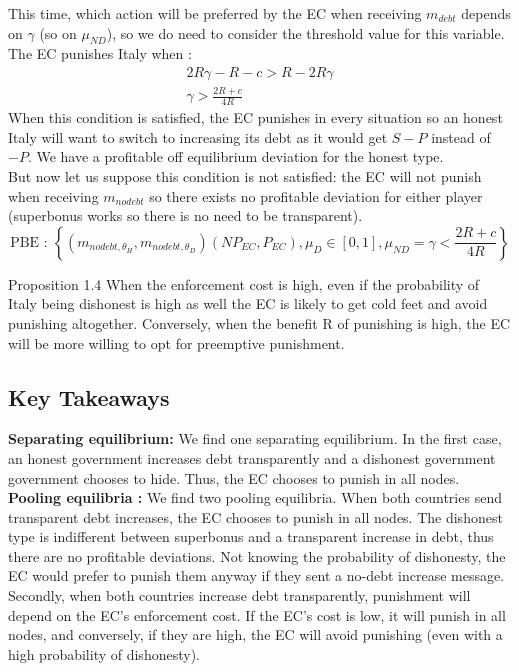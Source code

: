 \documentclass{article}
\begin{document}
This time, which action will be preferred by the EC when receiving $m_{debt}$ depends on $\gamma$ (so on $\mu_{ND}$), so we do need to consider the threshold value for this variable. The EC punishes Italy when : 
\begin{equation}
\begin{aligned}
    2R\gamma-R-c>R-2R\gamma\\
    \gamma >\frac{2R+c}{4R}
\end{aligned}
\end{equation}
When this condition is satisfied, the EC punishes in every situation so an honest Italy will want to switch to increasing its debt as it would get $S-P$ instead of $-P$. We have a profitable off equilibrium deviation for the honest type. \\
But now let us suppose this condition is not satisfied: the EC will not punish when receiving $m_{nodebt}$ so there exists no profitable deviation for either player (superbonus works so there is no need to be transparent).
\begin{equation}
    \text{PBE : } \left\{(m_{nodebt,\theta_H}, m_{nodebt,\theta_D})(NP_{EC},P_{EC}),\mu_D\in
[0,1],\mu_{ND}=\gamma<\frac{2R+c}{4R} \right\}
\end{equation}
\begin{simplebox}{Proposition 1.4}
    When the enforcement cost is high, even if the probability of Italy being dishonest is high as well the EC is likely to get cold feet and avoid punishing altogether. Conversely, when the benefit R of punishing is high, the EC will be more willing to opt for preemptive punishment. 
\end{simplebox}

\subsection{Key Takeaways}

\textbf{Separating equilibrium:}
We find one separating equilibrium. In the first case, an honest government increases debt transparently and a dishonest government government chooses to hide. Thus, the EC chooses to punish in all nodes. \\

\textbf{Pooling equilibria :}
We find two pooling equilibria. 
When both countries send transparent debt increases, the EC chooses to punish in all nodes. The dishonest type is indifferent between superbonus and a transparent increase in debt, thus there are no profitable deviations. Not knowing the probability of dishonesty, the EC would prefer to punish them anyway if they sent a no-debt increase message. Secondly, when both countries increase debt transparently, punishment will depend on the EC's enforcement cost. If the EC's cost is low, it will punish in all nodes, and conversely, if they are high, the EC will avoid punishing (even with a high probability of dishonesty). \\
\end{document}
